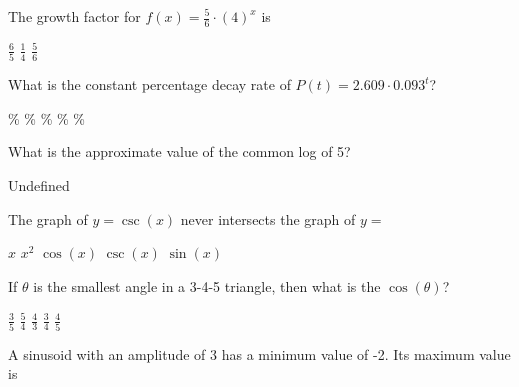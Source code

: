 \documentclass[../main.tex]{subfiles}
\begin{document}
\begin{questions}
    \question[1] The growth factor for $f(x) = \frac{5}{6}\cdot (4)^x$ is
    
    \begin{oneparchoices}
        \choice $\frac{6}{5}$ 
        \choice $\frac{1}{4}$
        \choice $\frac{5}{6}$
        \end{oneparchoices}  \answerline

    \question[1] What is the constant percentage decay rate of $P(t) = 2.609 \cdot 0.093^t$?
    
    \begin{oneparchoices}
        \%
        \%
        \%
        \%
        \%
        \end{oneparchoices}  \answerline
    
    \question[1] What is the approximate value of the common log of 5?
    
    \begin{oneparchoices}
        \choice Undefined
        \end{oneparchoices}  \answerline
    
    \question[1] The graph of $y = \csc(x)$ never intersects the graph of $y =$
    
    \begin{oneparchoices}
        \choice $x$
        \choice $x^2$
        \choice $\cos(x)$
        \choice $\csc(x)$
        \choice $\sin(x)$
        \end{oneparchoices}  \answerline
    
    \question[1] If $\theta$ is the smallest angle in a 3-4-5 triangle, then what is the $\cos(\theta)$?
    
    \begin{oneparchoices}
        \choice $\frac{3}{5}$
        \choice $\frac{5}{4}$
        \choice $\frac{4}{3}$
        \choice $\frac{3}{4}$
        \choice $\frac{4}{5}$
        \end{oneparchoices}  \answerline
    
    \question[1] A sinusoid with an amplitude of 3 has a minimum value of -2. Its maximum value is
    

\end{questions}
\end{document}
